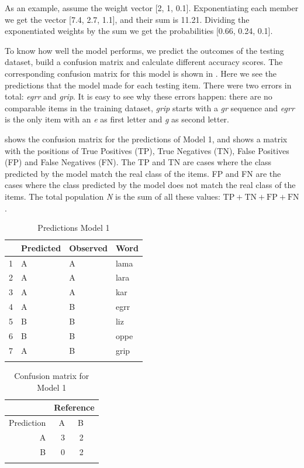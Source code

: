 As an example, assume the weight vector [2, 1, 0.1]. Exponentiating each member we get the vector [7.4, 2.7, 1.1], and their sum is 11.21. Dividing the exponentiated weights by the sum we get the probabilities [0.66, 0.24, 0.1].

To know how well the model performs, we predict the outcomes of the testing dataset, build a confusion matrix and calculate different accuracy scores. The corresponding confusion matrix for this model is shown in . Here we see the predictions that the model made for each testing item. There were two errors in total: \textit{egrr} and \textit{grip}. It is easy to see why these errors happen: there are no comparable items in the training dataset, \textit{grip} starts with a \textit{gr} sequence and \textit{egrr} is the only item with an \textit{e} as first letter and \textit{g} as second letter.

 shows the confusion matrix for the predictions of Model 1, and  shows a matrix with the positions of True Positives (TP), True Negatives (TN), False Positives (FP) and False Negatives (FN). The TP and TN are cases where the class predicted by the model match the real class of the items. FP and FN are the cases where the class predicted by the model does not match the real class of the items. The total population \textit{N} is the sum of all these values: $\textrm{TP}+\textrm{TN}+\textrm{FP}+\textrm{FN}$.

\begin{table}[!htpb]
  \centering
  \begin{tabular}{llll}
    \lsptoprule
    & Predicted & Observed & Word \\
    \midrule
    1 & A & A & lama \\
    2 & A & A & lara \\
    3 & A & A & kar \\
    4 & A & B & egrr \\
    5 & B & B & liz \\
    6 & B & B & oppe \\
    7 & A & B & grip \\
    \lspbottomrule
  \end{tabular}
  \caption{Predictions Model 1}\label{tab:preds-model1}
\end{table}

\begin{table}[!htpb]
  \centering
  \begin{tabular}{rrrr}
    \lsptoprule
               & \multicolumn{3}{c}{Reference} \\
    \midrule
    Prediction & A  & B                        \\
    A          & 3  & 2                        \\
    B          & 0  & 2                        \\
    \lspbottomrule
  \end{tabular}
    \caption{Confusion matrix for Model 1}\label{tab:model1-conf}
\end{table}

